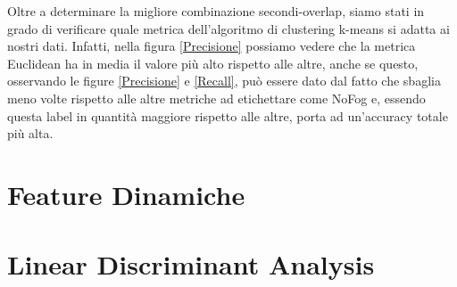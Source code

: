 Oltre a determinare la migliore combinazione secondi-overlap, siamo stati in grado di verificare quale metrica dell'algoritmo di clustering k-means si adatta ai nostri dati. Infatti, nella figura \ref{Precisione} possiamo vedere che la metrica Euclidean ha in media il valore più alto rispetto alle altre, anche se questo, osservando le figure \ref{Precisione} e \ref{Recall}, può essere dato dal fatto che sbaglia meno volte rispetto alle altre metriche ad etichettare come NoFog e, essendo questa label in quantità maggiore rispetto alle altre, porta ad un'accuracy totale più alta.\\

\section{Feature Dinamiche}


\section{Linear Discriminant Analysis}












